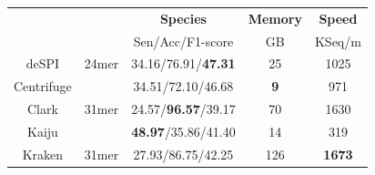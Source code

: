 \documentclass[a0,portrait]{a0poster}
\begin{document}
\begin{multicols}{2}
\begin{center}\vspace{1cm}
\footnotesize
\begin{tabular}{ccccc}
\toprule
& & \textbf{Species} & \textbf{Memory} & \textbf{Speed}\\
\cline{3-5}
& & Sen/Acc/F1-score & GB & KSeq/m\\
\midrule
deSPI & 24mer & 34.16/76.91/\textbf{47.31} & 25 & 1025\\
Centrifuge	 & & 34.51/72.10/46.68 & \textbf{9} & 971\\
Clark	 & 31mer & 24.57/\textbf{96.57}/39.17 & 70 & 1630\\
Kaiju	 & & \textbf{48.97}/35.86/41.40 & 14 & 319\\
Kraken & 31mer & 27.93/86.75/42.25 & 126 & \textbf{1673}\\
\bottomrule
\end{tabular}
\end{center}\vspace{1cm}
%
%


\end{multicols}
\end{document}
